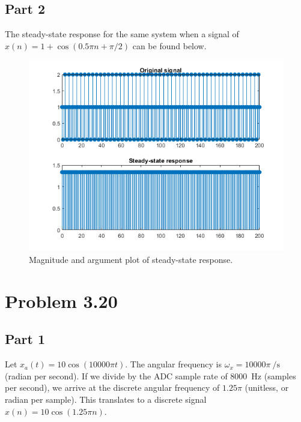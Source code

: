 \documentclass{article}
\begin{document}
\subsection*{Part 2}
The steady-state response for the same system when a signal of
\(x(n) = 1 + \cos(0.5\pi n + \pi/2)\) can be found below.

\begin{figure}[H]
    \centering
    \includegraphics[width=\textwidth]{"Images/3-18 Fig3"}
    \caption{Magnitude and argument plot of steady-state response.}
    \label{plot:3.18.2}
\end{figure}

\section*{Problem 3.20}
\subsection*{Part 1}
Let \(x_a(t) = 10\cos(10000\pi t)\). The angular frequency is
\(\omega_x = \num{10000}\pi~\si{\per\second}\) (radian per second).
If we divide by the ADC sample rate of \SI{8000}{\hertz}
(samples per second), we arrive at the discrete angular
frequency of \(1.25\pi\) (unitless, or radian per sample).
This translates to a discrete signal \(x(n) = 10\cos(1.25\pi n)\).
\end{document}
